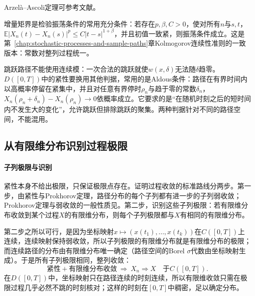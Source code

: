 Arzelà--Ascoli定理可参考文献。

增量矩界是检验振荡条件的常用充分条件：若存在$p,\beta,C>0$，使对所有$n$与$s,t$，$\mathbb E|X_n(t)-X_n(s)|^p\leq C|t-s|^{1+\beta}$，并且初值一致紧，则振荡条件成立。这是第~\ref{chap:stochastic-processes-and-sample-paths}章Kolmogorov连续性准则的一致版本：常数对整列过程统一。

跳跃路径不能使用连续模：一次合法的跳跃就使$w(x,\delta)$无法随$\delta$趋零。$D([0,T])$中的紧性要换用其他判据，常用的是Aldous条件：路径在有界时间内以高概率停留在紧集中，并且对任意有界停时$\rho_n$与趋于零的常数$\delta_n$，$X_n(\rho_n+\delta_n)-X_n(\rho_n)\to0$依概率成立。它要求的是“在随机时刻之后的短时间内不发生大的变化”，允许跳跃但排除跳跃的聚集。两种判据针对不同的路径空间，不能混用。

\subsection{从有限维分布识别过程极限}
\label{sec:ctsp-identify-limit}

\paragraph{子列极限与识别}
紧性本身不给出极限，只保证极限点存在。证明过程收敛的标准路线分两步。第一步，由紧性与Prokhorov定理，路径分布的每个子列都有进一步的子列弱收敛；Prokhorov定理与弱收敛的一般性质见。第二步，识别这些子列极限：若有限维分布收敛到某个过程$X$的有限维分布，则每个子列极限都与$X$有相同的有限维分布。

第二步之所以可行，是因为坐标映射$x\mapsto(x(t_1),\ldots,x(t_k))$在$C([0,T])$上连续，连续映射保持弱收敛，所以子列极限的有限维分布就是有限维分布的极限；而连续路径的分布由有限维分布唯一确定（路径空间的Borel $\sigma$代数由坐标映射生成）。于是所有子列极限相同，整列收敛：
\[
  \text{紧性}+\text{有限维分布收敛}\ \Longrightarrow\ X_n\Rightarrow X\quad\text{于}C([0,T]).
\]
在$D([0,T])$中，坐标映射只在路径连续的时刻连续，所以有限维收敛只需在极限过程几乎必然不跳的时刻核对；这样的时刻在$[0,T]$中稠密，足以确定分布。


